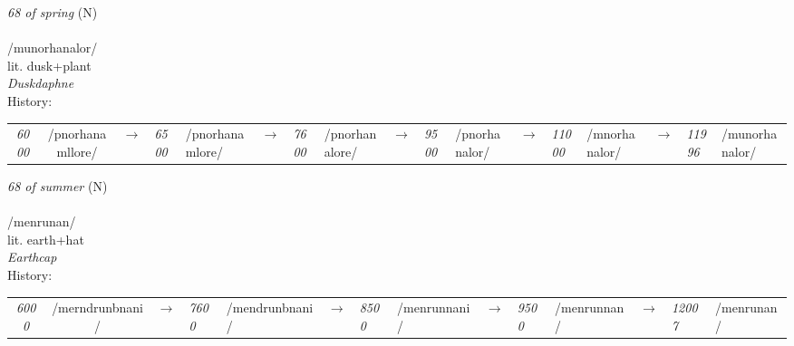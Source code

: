 \vspace{15pt}
\begin{nopagebreak}
 \textit{68 of spring} (N)\\
\\
\noindent /munorhan{\textprimstress}alor/\\
\noindent lit. dusk+plant\\
\noindent \textit{Duskdaphne}\\


\noindent History:

\vspace{-0pt}
\hspace{40pt}
\begin{tabular}{ccc}
\textit{6000} & /pnorhanamllore/&$\rightarrow$ & \textit{6500} & /pnorhanamlore/&$\rightarrow$ & \textit{7600} & /pnorhanalore/&$\rightarrow$ & \textit{9500} & /pnorhanalor/&$\rightarrow$ & \textit{11000} & /mnorhanalor/&$\rightarrow$ & \textit{11996} & /munorhanalor/& \\
\end{tabular}

\vspace{20pt}\hline

\end{nopagebreak}
\filbreak



\vspace{15pt}
\begin{nopagebreak}
 \textit{68 of summer} (N)\\
\\
\noindent /menr{\textprimstress}unan/\\
\noindent lit. earth+hat\\
\noindent \textit{Earthcap}\\


\noindent History:

\vspace{-0pt}
\hspace{40pt}
\begin{tabular}{ccc}
\textit{6000} & /merndrunbnani/&$\rightarrow$ & \textit{7600} & /mendrunbnani/&$\rightarrow$ & \textit{8500} & /menrunnani/&$\rightarrow$ & \textit{9500} & /menrunnan/&$\rightarrow$ & \textit{12007} & /menrunan/& \\
\end{tabular}

\vspace{20pt}\hline

\end{nopagebreak}
\filbreak



